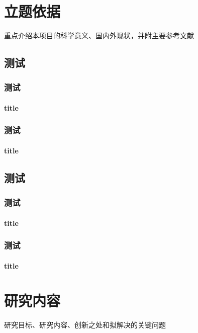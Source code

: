 \documentclass{fdu-doctorplan}
\begin{document}
\chapter{立题依据}
重点介绍本项目的科学意义、国内外现状，并附主要参考文献

\section{测试}
\zhlipsum[1-3]
\subsection{测试}
\zhlipsum[1-3]
\subsubsection{title}
\zhlipsum[1-3]

\subsection{测试}
\zhlipsum[1-3]
\subsubsection{title}
\zhlipsum[1-3]

\section{测试}
\zhlipsum[1-3]
\subsection{测试}
\zhlipsum[1-3]
\subsubsection{title}
\zhlipsum[1-3]

\subsection{测试}
\zhlipsum[1-3]
\subsubsection{title}
\zhlipsum[1-3]


\chapter{研究内容}
研究目标、研究内容、创新之处和拟解决的关键问题
\end{document}
